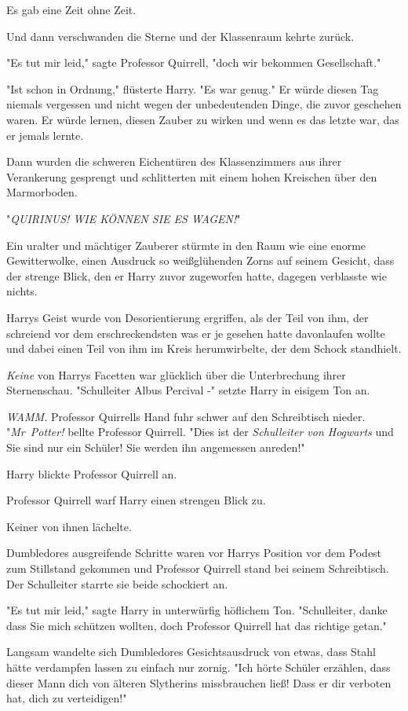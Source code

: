 {Es gab eine Zeit ohne Zeit.

Und dann verschwanden die Sterne und der Klassenraum kehrte zurück.

"Es tut mir leid," sagte Professor Quirrell, "doch wir bekommen Gesellschaft."

"Ist schon in Ordnung," flüsterte Harry. "Es war genug." Er würde diesen Tag niemals vergessen und nicht wegen der unbedeutenden Dinge, die zuvor geschehen waren. Er würde lernen, diesen Zauber zu wirken und wenn es das letzte war, das er jemals lernte.

Dann wurden die schweren Eichentüren des Klassenzimmers aus ihrer Verankerung gesprengt und schlitterten mit einem hohen Kreischen über den Marmorboden.

"\emph{QUIRINUS! WIE KÖNNEN SIE ES WAGEN!}"

Ein uralter und mächtiger Zauberer stürmte in den Raum wie eine enorme Gewitterwolke, einen Ausdruck so weißglühenden Zorns auf seinem Gesicht, dass der strenge Blick, den er Harry zuvor zugeworfen hatte, dagegen verblasste wie nichts.

Harrys Geist wurde von Desorientierung ergriffen, als der Teil von ihm, der schreiend vor dem erschreckendsten was er je gesehen hatte davonlaufen wollte und dabei einen Teil von ihm im Kreis herumwirbelte, der dem Schock standhielt.

\emph{Keine} von Harrys Facetten war glücklich über die Unterbrechung ihrer Sternenschau. "Schulleiter Albus Percival -" setzte Harry in eisigem Ton an.

\emph{WAMM.} Professor Quirrells Hand fuhr schwer auf den Schreibtisch nieder. "\emph{Mr~Potter!} bellte Professor Quirrell. "Dies ist der \emph{Schulleiter von Hogwarts} und Sie sind nur ein Schüler! Sie werden ihn angemessen anreden!"

Harry blickte Professor Quirrell an.

Professor Quirrell warf Harry einen strengen Blick zu.

Keiner von ihnen lächelte.

Dumbledores ausgreifende Schritte waren vor Harrys Position vor dem Podest zum Stillstand gekommen und Professor Quirrell stand bei seinem Schreibtisch. Der Schulleiter starrte sie beide schockiert an.

"Es tut mir leid," sagte Harry in unterwürfig höflichem Ton. "Schulleiter, danke dass Sie mich schützen wollten, doch Professor Quirrell hat das richtige getan."

Langsam wandelte sich Dumbledores Gesichtsausdruck von etwas, dass Stahl hätte verdampfen lassen zu einfach nur zornig. "Ich hörte Schüler erzählen, dass dieser Mann dich von älteren Slytherins missbrauchen ließ! Dass er dir verboten hat, dich zu verteidigen!"

}
